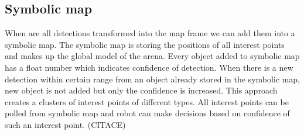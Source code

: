 \subsection{Symbolic map}
When are all detections transformed into the map frame we can add them into a symbolic map. The symbolic map is storing the positions of all interest points and makes up the global model of the arena. Every object added to symbolic map has a float number which indicates confidence of detection. When there is a new detection within certain range from an object already stored in the symbolic map, new object is not added but only the confidence is increased. This approach creates a clusters of interest points of different types. All interest points can be polled from symbolic map and robot can make decisions based on confidence of such an interest point. (CITACE)